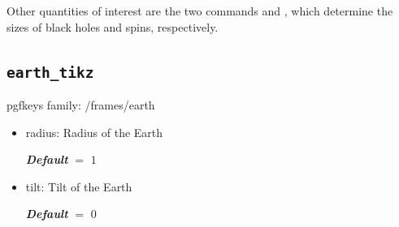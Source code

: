 \documentclass[
    DIV=11,
    BCOR=0mm,
    paper=a4,
    fontsize=11pt,
    twoside=false,
    titlepage=true
]{scrartcl}
\newcommand{\code}[1]{{\color{codecolor}\ttfamily#1}}  %
\newcommand{\defaultval}[1]{%
    {\bfseries\slshape%
    Default} $=$ \texttt{#1}%
}
\begin{document}
Other quantities of interest are the two commands \code{\string\cbcframes@BHsizepersolmass} and \code{\string\cbcframes@UnitSpinSize}, which determine the sizes of black holes and spins, respectively.



        \subsection{\texttt{earth\_tikz}}\label{sec:earth_tikz}
\code{pgfkeys} family: \code{/frames/earth}


\begin{itemize}

    \item \code{radius}: Radius of the Earth

    \defaultval{$1$}


    \item \code{tilt}: Tilt of the Earth

    \defaultval{$0$}
\end{itemize}
\end{document}
